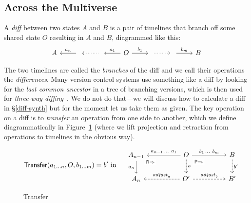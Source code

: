 \documentclass[english,submission]{programming}
\theoremstyle{definition}
\newcommand{\mathbox}[1]{\colorbox{black!10}{$#1$\phantom{i\hspace{-3.5pt}}}}
\begin{document}
\subsection{Across the Multiverse}\label{transfer}

  A \textit{diff} between two states \mathbox{A} and \mathbox{B} is a pair of timelines that branch off some shared state \mathbox{O} resulting in \mathbox{A} and \mathbox{B}, diagrammed like this:
\[\begin{tikzcd}
	A & {} & {} & O & {} & {} & B
	\arrow["{{a_n}}"', from=1-2, to=1-1]
	\arrow[dotted, from=1-3, to=1-2]
	\arrow["{{a_1}}"', from=1-4, to=1-3]
	\arrow["{b_1}", from=1-4, to=1-5]
	\arrow[dotted, from=1-5, to=1-6]
	\arrow["{b_m}", from=1-6, to=1-7]
\end{tikzcd}\]

The two timelines are called the \textit{branches} of the diff and we call their operations the \textit{differences}. Many version control systems use something like a diff by looking for the \textit{last common ancestor} in a tree of branching versions, which is then used for \textit{three-way diffing}~\cite{diff3}. We do not do that---we will discuss how to calculate a diff in \S\ref{diff-synth} but for the moment let us take them as given. The key operation on a diff is to
\textit{transfer} an operation from one side to another, which we define diagrammatically in Figure~\ref{fig:transfer} (where we lift projection and retraction from operations to timelines in the obvious way).
\vspace{-16pt}
\begin{figure}[h]
\[
\textsf{Transfer}(a_{1\ldots n}, O, b_{1\ldots m}) = b' \textrm{ in }\quad
\begin{tikzcd}[column sep = huge]
	A_{n-1} & O & B \\
	A_n & {O'} & {B'}
	\arrow["{a_n}"', from=1-1, to=2-1]
	\arrow["{\textsf{R}\Rightarrow}"{description, pos=0.1}, draw=none, from=1-1, to=2-2]
	\arrow["{a_{n-1}\,\ldots\  a_1}"', from=1-2, to=1-1]
	\arrow["{b_1\,\ldots \  b_m}", from=1-2, to=1-3]
	\arrow["o", dashed, from=1-2, to=2-2]
	\arrow["{\textsf{P}\Rightarrow}"{description, pos=0.2}, draw=none, from=1-2, to=2-3]
	\arrow["{b'}", dashed, from=1-3, to=2-3]
	\arrow["{\mathit{adjust}_a}"', dashed, from=2-2, to=2-1]
	\arrow["{\mathit{adjust}_b}", dashed, from=2-2, to=2-3]
\end{tikzcd}\]
\vspace{-16pt}
\caption{Transfer}
\label{fig:transfer}
\end{figure}
\end{document}
